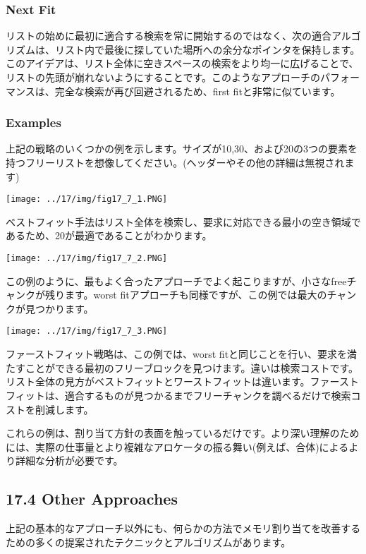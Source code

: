 \hypertarget{next-fit}{%
\subsubsection*{Next Fit}\label{next-fit}}

リストの始めに最初に適合する検索を常に開始するのではなく、次の適合アルゴリズムは、リスト内で最後に探していた場所への余分なポインタを保持します。このアイデアは、リスト全体に空きスペースの検索をより均一に広げることで、リストの先頭が崩れないようにすることです。このようなアプローチのパフォーマンスは、完全な検索が再び回避されるため、first
fitと非常に似ています。

\hypertarget{examples}{%
\subsubsection*{Examples}\label{examples}}

上記の戦略のいくつかの例を示します。サイズが10,30、および20の3つの要素を持つフリーリストを想像してください。(ヘッダーやその他の詳細は無視されます)

\texttt{[image: ../17/img/fig17\_7\_1.PNG]}

ベストフィット手法はリスト全体を検索し、要求に対応できる最小の空き領域であるため、20が最適であることがわかります。

\texttt{[image: ../17/img/fig17\_7\_2.PNG]}

この例のように、最もよく合ったアプローチでよく起こりますが、小さなfreeチャンクが残ります。worst
fitアプローチも同様ですが、この例では最大のチャンクが見つかります。

\texttt{[image: ../17/img/fig17\_7\_3.PNG]}

ファーストフィット戦略は、この例では、worst
fitと同じことを行い、要求を満たすことができる最初のフリーブロックを見つけます。違いは検索コストです。リスト全体の見方がベストフィットとワーストフィットは違います。ファーストフィットは、適合するものが見つかるまでフリーチャンクを調べるだけで検索コストを削減します。

これらの例は、割り当て方針の表面を触っているだけです。より深い理解のためには、実際の仕事量とより複雑なアロケータの振る舞い(例えば、合体)によるより詳細な分析が必要です。

\hypertarget{other-approaches}{%
\subsection*{17.4 Other Approaches}\label{other-approaches}}

上記の基本的なアプローチ以外にも、何らかの方法でメモリ割り当てを改善するための多くの提案されたテクニックとアルゴリズムがあります。

